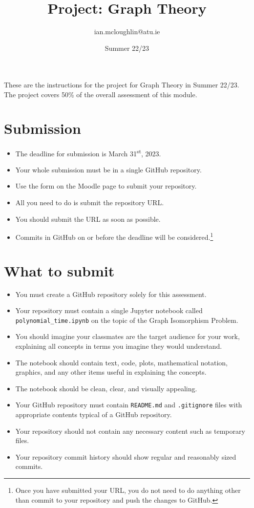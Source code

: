 \documentclass{iansnotes}
\title{Project: Graph Theory}
\author{ian.mcloughlin@atu.ie}
\date{Summer 22/23}
\begin{document}
 
\maketitle

These are the instructions for the project for Graph Theory in Summer 22/23.
The project covers 50\% of the overall assessment of this module.


\section{Submission}

\begin{itemize}
  \item The deadline for submission is March 31\textsuperscript{st}, 2023. 
  \item Your whole submission must be in a single GitHub repository.
  \item Use the form on the Moodle page to submit your repository.
  \item All you need to do is submit the repository URL.
  \item You should submit the URL as soon as possible.
  \item Commits in GitHub on or before the deadline will be considered.\footnote{Once you have submitted your URL, you do not need to do anything other than commit to your repository and push the changes to GitHub.}
\end{itemize}


\section{What to submit}

\begin{itemize}
  \item You must create a GitHub repository solely for this assessment.
  \item Your repository must contain a single Jupyter notebook called \texttt{polynomial\_time.ipynb} on the topic of the Graph Isomorphism Problem.
  \item You should imagine your classmates are the target audience for your work, explaining all concepts in terms you imagine they would understand.
  \item The notebook should contain text, code, plots, mathematical notation, graphics, and any other items useful in explaining the concepts.
  \item The notebook should be clean, clear, and visually appealing.
  \item Your GitHub repository must contain \texttt{README.md} and \texttt{.gitignore} files with appropriate contents typical of a GitHub repository.
  \item Your repository should not contain any necessary content such as temporary files.
  \item Your repository commit history should show regular and reasonably sized commits.
\end{itemize}
\end{document}
